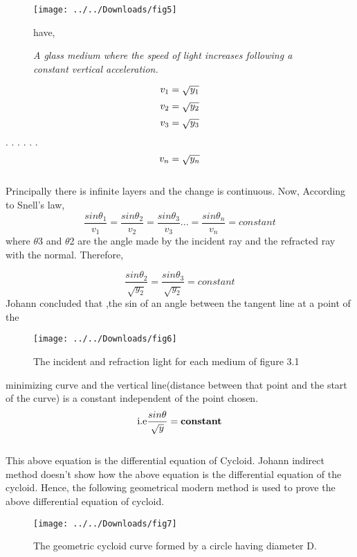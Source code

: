 \documentclass[10pt,a4paper]{article}
\begin{document}
\begin{center}
\begin{flushleft}
	\newpage
	\begin{figure}[h]
		\centering
		\texttt{[image: ../../Downloads/fig5]}
		\caption{\textit{A glass medium where the speed of light increases following a constant vertical acceleration.}}
		have,
		\vspace{0.5 cm}
		
	\end{figure}
      \begin{equation}
     	$$v_{1}=\sqrt{y_{1}}$$
      \end{equation}
  \begin{equation}
  	$$v_{2}=\sqrt{y_{2}}$$
  \end{equation}
\begin{equation}
	$$v_{3}=\sqrt{y_{3}}$$ \\
\end{equation}
	. . . . . .
	\begin{equation}
		$$v_{n}=\sqrt{y_{n}}$$
	\end{equation}
\vspace{0.5 cm}
\\Principally there is infinite layers and the change is continuous. Now, According to
Snell’s law,
\begin{equation}
	\dfrac{sin \theta_{1}}{v_{1}} = \dfrac{sin \theta_{2}}{v_{2}} =\dfrac{sin \theta_{3}}{v_{3}} . . . = 	\dfrac{sin \theta_{n}}{v_{n}} = constant
\end{equation}
where $\theta$3 and $\theta$2 are the angle made by the incident ray and the refracted ray with the
normal. Therefore,

\begin{equation}
	\dfrac{sin \theta_{2}}{\sqrt{y_{2}}} = \dfrac{sin \theta_{3}}{\sqrt{y_{2}}}  = constant
	\end{equation}
Johann concluded that ,the sin of an angle between the tangent line at a point of the
\newpage
\begin{figure}[h]
	\centering
	\texttt{[image: ../../Downloads/fig6]}
	\caption{The incident and refraction light for each medium of figure 3.1}
	\label{fig:fig6}
\end{figure}
minimizing curve and the vertical line(distance between that point and the start of the
curve) is a constant independent of the point chosen.
\begin{equation}
 $i.e$\dfrac{sin\theta}{\sqrt{y}} =\textbf{constant}
\end{equation}
\vspace{0.5 cm}
\\ This above equation is the differential equation of Cycloid. Johann indirect method doesn’t show how the above equation is the differential equation of the cycloid. Hence, the following geometrical modern method is used to prove the above differential equation of cycloid.
\begin{figure}[h]
	\centering
	\texttt{[image: ../../Downloads/fig7]}
	\caption{The geometric cycloid curve formed by a circle having diameter D.}
\end{figure}


\end{flushleft}
\end{center}
\end{document}
